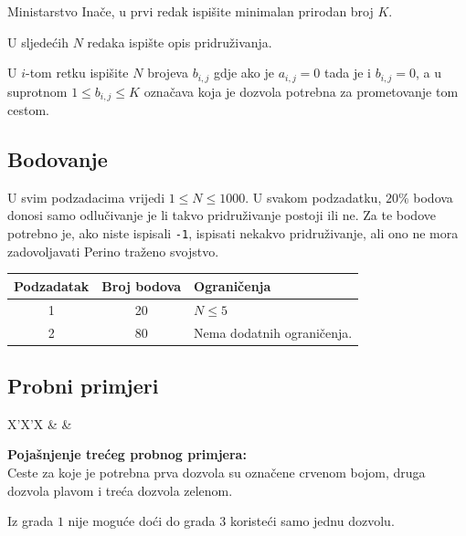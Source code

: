 \begin{statement}[
  problempoints=100,
  timelimit=1 sekunda,
  memorylimit=1024 MiB,
]{Ministarstvo}
Inače, u prvi redak ispišite minimalan prirodan broj $K$.

U sljedećih $N$ redaka ispište opis pridruživanja.

U $i$-tom retku ispišite $N$ brojeva $b_{i, j}$ gdje ako je $a_{i, j} = 0$ tada je i $b_{i, j} = 0$, a u suprotnom $1 \leq b_{i, j} \leq K$ označava koja je dozvola potrebna za prometovanje tom cestom. 

\subsection*{Bodovanje}

U svim podzadacima vrijedi $1 \leq N \leq 1000$. U svakom podzadatku, $20\%$ bodova donosi samo odlučivanje je li takvo pridruživanje postoji ili ne. Za te bodove potrebno je, ako niste ispisali \texttt{-1}, ispisati nekakvo pridruživanje, ali ono ne mora zadovoljavati Perino traženo svojstvo. 

{\renewcommand{\arraystretch}{1.4}
  \setlength{\tabcolsep}{6pt}
  \begin{tabular}{ccl}
   Podzadatak & Broj bodova & Ograničenja \\ \midrule
    1 & 20 & $N \leq 5$  \\
    2 & 80 & Nema dodatnih ograničenja. \\
\end{tabular}}

\subsection*{Probni primjeri}
\begin{tabularx}{\textwidth}{X'X'X}
 &
 &
\end{tabularx}

\textbf{Pojašnjenje trećeg probnog primjera:}\\

Ceste za koje je potrebna prva dozvola su označene crvenom bojom, druga dozvola plavom i treća dozvola zelenom. 

Iz grada $1$ nije moguće doći do grada $3$ koristeći samo jednu dozvolu.


\end{statement}
